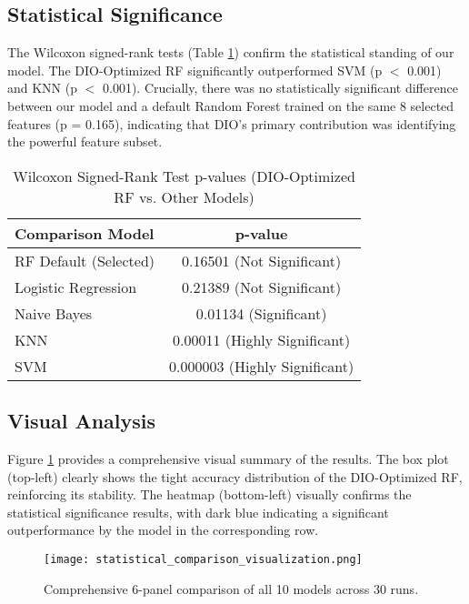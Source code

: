 \documentclass[12pt, a4paper]{article}
\begin{document}
\subsection{Statistical Significance}
The Wilcoxon signed-rank tests (Table \ref{tab:wilcoxon}) confirm the statistical standing of our model. The DIO-Optimized RF significantly outperformed SVM (p $<$ 0.001) and KNN (p $<$ 0.001). Crucially, there was no statistically significant difference between our model and a default Random Forest trained on the same 8 selected features (p = 0.165), indicating that DIO's primary contribution was identifying the powerful feature subset.

\begin{table}[H]
    \centering
    \caption{Wilcoxon Signed-Rank Test p-values (DIO-Optimized RF vs. Other Models)}
    \label{tab:wilcoxon}
    \begin{tabular}{lc}
        \toprule
        \textbf{Comparison Model} & \textbf{p-value} \\
        \midrule
        RF Default (Selected) & 0.16501 (Not Significant) \\
        Logistic Regression & 0.21389 (Not Significant) \\
        Naive Bayes & 0.01134 (Significant) \\
        KNN & 0.00011 (Highly Significant) \\
        SVM & 0.000003 (Highly Significant) \\
        \bottomrule
    \end{tabular}
\end{table}

\subsection{Visual Analysis}
Figure \ref{fig:main_viz} provides a comprehensive visual summary of the results. The box plot (top-left) clearly shows the tight accuracy distribution of the DIO-Optimized RF, reinforcing its stability. The heatmap (bottom-left) visually confirms the statistical significance results, with dark blue indicating a significant outperformance by the model in the corresponding row.

\begin{figure}[H]
    \centering
    \texttt{[image: statistical\_comparison\_visualization.png]}
    \caption{Comprehensive 6-panel comparison of all 10 models across 30 runs.}
    \label{fig:main_viz}
\end{figure}
\end{document}
